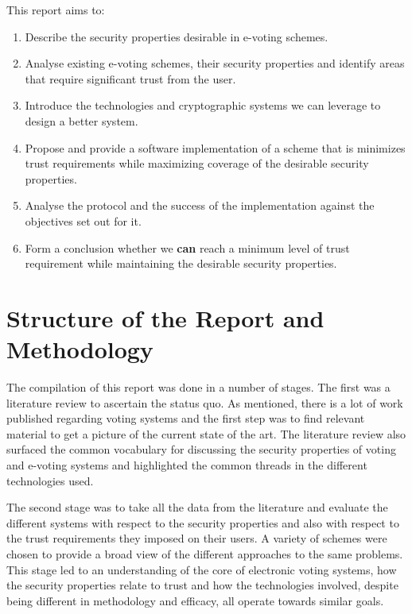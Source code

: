 This report aims to:

\begin{enumerate}
    \item Describe the security properties desirable in e-voting schemes.
    \item Analyse existing e-voting schemes, their security properties and identify areas that require significant trust from the user.
    \item Introduce the technologies and cryptographic systems we can leverage to design a better system.
    \item Propose and provide a software implementation of a scheme that is minimizes trust requirements while maximizing coverage of the desirable security properties.
    \item Analyse the protocol and the success of the implementation against the objectives set out for it.
    \item Form a conclusion whether we {\textbf{can}} reach a minimum level of trust requirement while maintaining the desirable security properties.
\end{enumerate}


\section{Structure of the Report and Methodology}
\label{ch:intro:method}

The compilation of this report was done in a number of stages. The first was a literature review to ascertain the status quo. As mentioned, there is a lot of work published regarding voting systems and the first step was to find relevant material to get a picture of the current state of the art. The literature review also surfaced the common vocabulary for discussing the security properties of voting and e-voting systems and highlighted the common threads in the different technologies used.

The second stage was to take all the data from the literature and evaluate the different systems with respect to the security properties and also with respect to the trust requirements they imposed on their users. A variety of schemes were chosen to provide a broad view of the different approaches to the same problems.
This stage led to an understanding of the core of electronic voting systems, how the security properties relate to trust and how the technologies involved, despite being different in methodology and efficacy, all operate towards similar goals.

